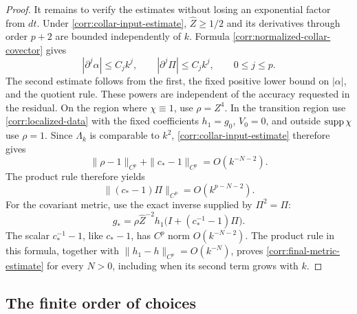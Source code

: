 \begin{proof}
It remains to verify the estimates without losing an exponential
factor from \(dt\).  Under \eqref{corr:collar-input-estimate},
\(\widehat Z\ge1/2\) and its derivatives through order \(p+2\)
are bounded independently of \(k\).  Formula
\eqref{corr:normalized-collar-covector} gives
\[
 |\partial^j\alpha|\le C_jk^j,
 \qquad |\partial^j\Pi|\le C_jk^j,
 \qquad 0\le j\le p.
\]
The second estimate follows from the first, the fixed positive lower
bound on \(|\alpha|\), and the quotient rule.  These powers are
independent of the accuracy requested in the residual.
On the region where \(\chi\equiv1\), use \(\rho=Z^4\).  In the
transition region use \eqref{corr:localized-data} with the fixed
coefficients \(h_1=g_0\), \(V_0=0\), and outside \(\operatorname{supp}\chi\)
use \(\rho=1\).  Since \(\Lambda_k\) is comparable to \(k^2\),
\eqref{corr:collar-input-estimate} therefore gives
\[
 \|\rho-1\|_{C^p}+\|c_*-1\|_{C^p}=O(k^{-N-2}).
\]
The product rule therefore yields
\[
 \|(c_*-1)\Pi\|_{C^p}=O(k^{p-N-2}).
\]
For the covariant metric, use the exact inverse supplied by
\(\Pi^2=\Pi\):
\[
 g_*=\rho\widehat Z^{-2}h_1
                  \bigl(I+(c_*^{-1}-1)\Pi\bigr).
\]
The scalar \(c_*^{-1}-1\), like \(c_*-1\), has \(C^p\) norm
\(O(k^{-N-2})\).  The product rule in this formula, together with
\(\|h_1-h\|_{C^p}=O(k^{-N})\), proves
\eqref{corr:final-metric-estimate} for every \(N>0\), including when
its second term grows with \(k\).
\end{proof}

\subsection{The finite order of choices}

